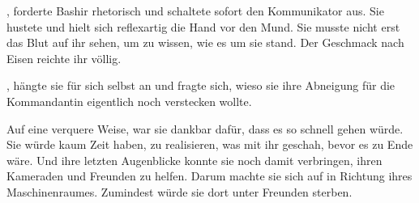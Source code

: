 \par

, forderte Bashir rhetorisch und schaltete sofort den Kommunikator aus. Sie hustete und hielt sich reflexartig die Hand vor den Mund. Sie musste nicht erst das Blut auf ihr sehen, um zu wissen, wie es um sie stand. Der Geschmack nach Eisen reichte ihr völlig.

\par

, hängte sie für sich selbst an und fragte sich, wieso sie ihre Abneigung für die Kommandantin eigentlich noch verstecken wollte.

\par

Auf eine verquere Weise, war sie dankbar dafür, dass es so schnell gehen würde. Sie würde kaum Zeit haben, zu realisieren, was mit ihr geschah, bevor es zu Ende wäre. Und ihre letzten Augenblicke konnte sie noch damit verbringen, ihren Kameraden und Freunden zu helfen. Darum machte sie sich auf in Richtung ihres Maschinenraumes. Zumindest würde sie dort unter Freunden sterben.
